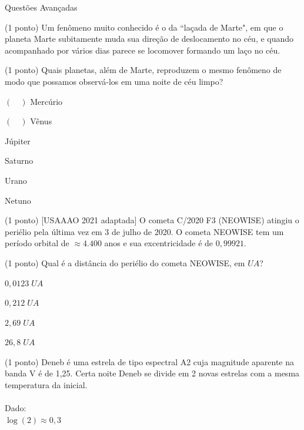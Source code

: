 \documentclass{../lista}
\begin{document}
	\begin{secao}{Questões Avançadas}
		\begin{questao}{(1 ponto)}
			Um fenômeno muito conhecido é o da ``laçada de Marte", em que o planeta Marte subitamente muda sua direção de deslocamento no céu, e quando acompanhado por vários dias parece se locomover formando um laço no céu.
			
			\begin{pergunta}{(1 ponto)}
				Quais planetas, além de Marte, reproduzem o mesmo fenômeno de modo que possamos observá-los em uma noite de céu limpo?
				
				\begin{multicols}{3}
					\begin{alternativas}
						\item[$(\quad)$] Mercúrio
						\item[$(\quad)$] Vênus
						\item Júpiter
						\item Saturno
						\item Urano
						\item Netuno
					\end{alternativas}
				\end{multicols}
			\end{pergunta}
		\end{questao}
		
		\begin{questao}{(1 ponto) [USAAAO 2021 adaptada]}
			O cometa C/2020 F3 (NEOWISE) atingiu o periélio pela última vez em 3 de julho de 2020. O cometa NEOWISE tem um período orbital de $\approx 4.400$ anos e sua excentricidade é de $0,99921$.
			
			\begin{pergunta}{(1 ponto)}
				Qual é a distância do periélio do cometa NEOWISE, em $UA$?
				
				\begin{alternativas}
					\item $0,0123 \; UA$
					\item $0,212 \; UA$
					\item $2,69 \; UA$
					\item $26,8 \; UA$
				\end{alternativas}
			\end{pergunta}
		\end{questao}
		
		\begin{questao}{(1 ponto)}
			Deneb é uma estrela de tipo espectral A2 cuja magnitude aparente na banda V é de 1,25. Certa noite Deneb se divide em 2 novas estrelas com a mesma temperatura da inicial. \\ \\
			Dado: \\
			$\log(2) \approx 0,3$
			

\end{questao}
\end{secao}
\end{document}
